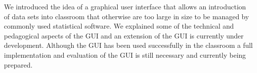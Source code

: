 \documentclass[11pt]{tise_style}
\begin{document}
We introduced the idea of a graphical user interface that allows an introduction of data sets into classroom that otherwise are too large in size to be managed by commonly used statistical software. We explained some of the technical and pedagogical aspects of the GUI and an extension of the GUI is currently under development. Although the GUI has been used successfully in the classroom a full implementation and evaluation of the GUI is still necessary and currently being prepared.


\end{document}

